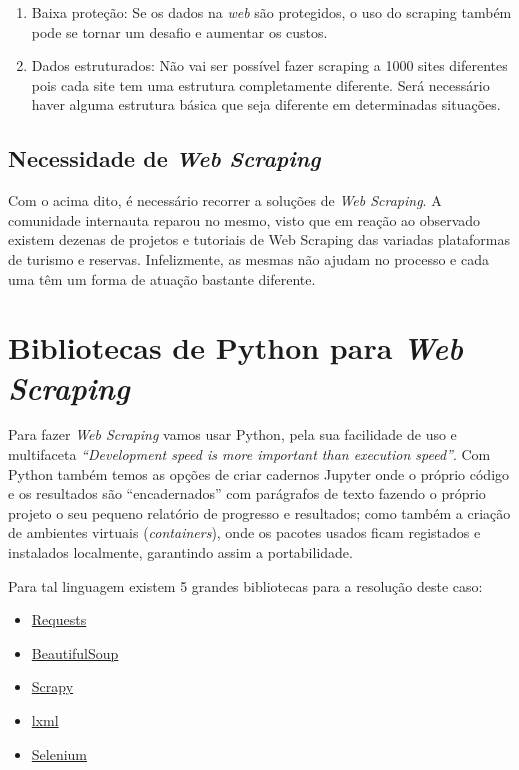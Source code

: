 \documentclass[a4paper,10pt]{article}
\begin{document}
\begin{enumerate}
    \item Baixa proteção: Se os dados na \textit{web} são protegidos, o uso do scraping também pode se tornar um desafio e aumentar os custos.
    \item Dados estruturados: Não vai ser possível fazer scraping a 1000 sites diferentes pois cada site tem uma estrutura completamente diferente. Será necessário haver alguma estrutura básica que seja diferente em determinadas situações.
\end{enumerate}

\subsection{Necessidade de \textit{Web Scraping}}

Com o acima dito, é necessário recorrer a soluções de \textit{Web Scraping}.
A comunidade internauta reparou no mesmo, visto que em reação ao observado existem dezenas de projetos e tutoriais de Web Scraping das variadas plataformas de turismo e reservas. 
Infelizmente, as mesmas não ajudam no processo e cada uma têm um forma de atuação bastante diferente.

\section{Bibliotecas de Python para \textit{Web Scraping}}

Para fazer \textit{Web Scraping} vamos usar Python, pela sua facilidade de uso e multifaceta \textit{``Development speed is more important than execution speed''}.
Com Python também temos as opções de criar cadernos Jupyter onde o próprio código e os resultados são ``encadernados'' com parágrafos de texto fazendo o próprio projeto o seu pequeno relatório de progresso e resultados; como também a criação de ambientes virtuais (\textit{containers}), onde os pacotes usados ficam registados e instalados localmente, garantindo assim a portabilidade.

Para tal linguagem existem 5 grandes bibliotecas para a resolução deste caso:
\begin{itemize}
    \item \href{https://pypi.org/project/requests/}{Requests}
    \item \href{https://pypi.org/project/BeautifulSoup/}{BeautifulSoup}
    \item \href{https://pypi.org/project/Scrapy3/}{Scrapy}
    \item \href{https://pypi.org/project/lxml/}{lxml}
    \item \href{https://pypi.org/project/selenium/}{Selenium}
\end{itemize}
\end{document}
